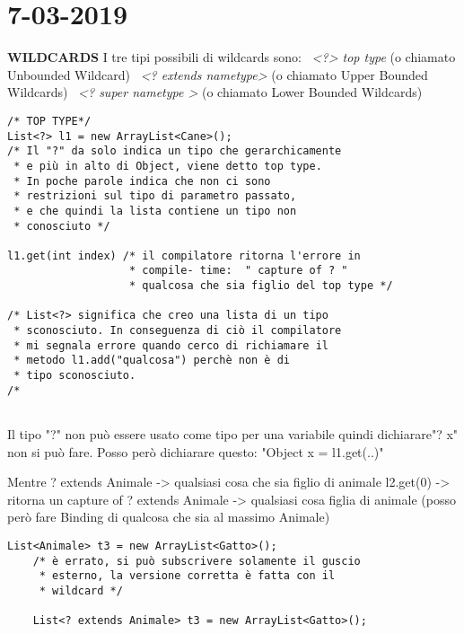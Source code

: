 

\newpage
\section{7-03-2019}
\textbf{WILDCARDS} \newline
I tre tipi possibili di wildcards sono: \newline
\textbullet\ \textit{<?> top type} (o chiamato Unbounded Wildcard) \newline
\textbullet\ \textit{<? extends nametype>} (o chiamato Upper Bounded Wildcards)\newline
\textbullet\ \textit{<? super nametype >} (o chiamato Lower Bounded Wildcards)\newline

\begin{lstlisting}[basicstyle=\small,]
/* TOP TYPE*/ 
List<?> l1 = new ArrayList<Cane>();
/* Il "?" da solo indica un tipo che gerarchicamente
 * e più in alto di Object, viene detto top type.
 * In poche parole indica che non ci sono 
 * restrizioni sul tipo di parametro passato,
 * e che quindi la lista contiene un tipo non
 * conosciuto */

l1.get(int index) /* il compilatore ritorna l'errore in
				   * compile- time:  " capture of ? " 
				   * qualcosa che sia figlio del top type */
				   
/* List<?> significa che creo una lista di un tipo
 * sconosciuto. In conseguenza di ciò il compilatore 
 * mi segnala errore quando cerco di richiamare il
 * metodo l1.add("qualcosa") perchè non è di
 * tipo sconosciuto.	
/*
			   
\end{lstlisting}

\noindent Il tipo "?" non può essere usato come tipo per una variabile quindi dichiarare"? x" non si può fare. Posso però dichiarare questo: "Object x = l1.get(..)" \newline




Mentre ? extends Animale -> qualsiasi cosa che sia figlio di animale \newline
l2.get(0) -> ritorna un capture of ? extends Animale -> qualsiasi cosa figlia di animale (posso però fare Binding di qualcosa che sia al massimo Animale) \newline

\begin{lstlisting}[basicstyle=\small,]
	List<Animale> t3 = new ArrayList<Gatto>();
	/* è errato, si può subscrivere solamente il guscio
	 * esterno, la versione corretta è fatta con il 
	 * wildcard */
	
	List<? extends Animale> t3 = new ArrayList<Gatto>();
\end{lstlisting}

